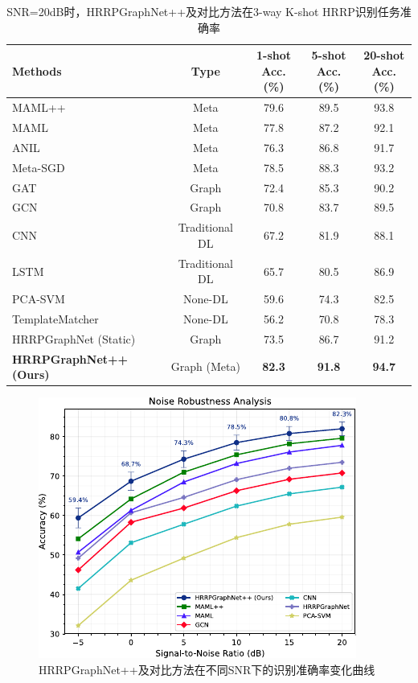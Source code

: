 \begin{table}[h!]
\centering
\caption{SNR=20dB时，HRRPGraphNet++及对比方法在3-way K-shot HRRP识别任务准确率}
\label{tab:fewshot_comparison_chap3}
\begin{tabular}{l|c|ccc}
\toprule
\textbf{Methods}  &\textbf{Type}                & \makecell{\textbf{1-shot}\\\textbf{Acc. (\%)}} & \makecell{\textbf{5-shot}\\\textbf{Acc. (\%)}} & \makecell{\textbf{20-shot}\\\textbf{Acc. (\%)}} \\
\midrule
MAML++ \cite{antoniou_how_2018}&Meta & 79.6   & 89.5   & 93.8    \\
MAML \cite{finn_model-agnostic_2017}&Meta       & 77.8   & 87.2   & 92.1    \\
ANIL \cite{aniruddh_anil_2020} &Meta& 76.3   & 86.8   & 91.7    \\
Meta-SGD \cite{li_meta-sgd_2017} & Meta& 78.5   & 88.3   & 93.2    \\
GAT \cite{velickovic_graph_2018}  & Graph&72.4   & 85.3   & 90.2    \\
GCN \cite{kipf_semi-supervised_2017}  & Graph&70.8   & 83.7   & 89.5    \\
CNN \cite{song_radar_2019}        & Traditional DL&67.2   & 81.9   & 88.1    \\
LSTM \cite{jithesh_lstm_2017}       & Traditional DL&65.7   & 80.5   & 86.9    \\
PCA-SVM \cite{liu_experimental_2020}     &None-DL& 59.6   & 74.3   & 82.5    \\
TemplateMatcher \cite{cui_template_2022} &None-DL& 56.2   & 70.8   & 78.3    \\
\midrule
HRRPGraphNet \cite{chen_hrrpgraphnet_2024} (Static) & Graph & 73.5   & 86.7   & 91.2    \\
\textbf{HRRPGraphNet++} \textbf{(Ours)} & Graph (Meta)& \textbf{82.3}   & \textbf{91.8}   & \textbf{94.7}    \\
\bottomrule
\end{tabular}
\end{table}

\begin{figure}[t]
    \centering
    \includegraphics[width=0.5\linewidth]{figures/noise_robust.pdf} %
    \caption{HRRPGraphNet++及对比方法在不同SNR下的识别准确率变化曲线}
    \label{fig:noise_robustness_chap3}
\end{figure}


